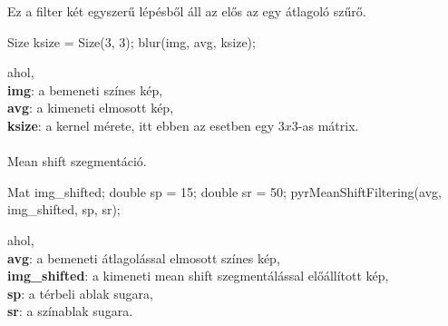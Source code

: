 Ez a filter két egyszerű lépésből áll az elős az egy átlagoló szűrő.
\begin{cpp}
Size ksize = Size(3, 3);
blur(img, avg, ksize);
\end{cpp}
 ahol, \\
\indent \textbf{img}: a bemeneti színes kép,\\
\indent \textbf{avg}: a kimeneti elmosott kép,\\
\indent \textbf{ksize}: a kernel mérete, itt ebben az esetben egy $3 x 3$-as mátrix. \\ \\
Mean shift szegmentáció.
\begin{cpp}
Mat img_shifted;
double sp = 15;
double sr = 50;
pyrMeanShiftFiltering(avg, img_shifted, sp, sr);
\end{cpp}
 ahol, \\
\indent \textbf{avg}: a bemeneti átlagolással elmosott színes kép,\\
\indent \textbf{img\_shifted}: a kimeneti mean shift szegmentálással előállított kép,\\
\indent \textbf{sp}: a térbeli ablak sugara,\\
\indent \textbf{sr}: a színablak sugara.



